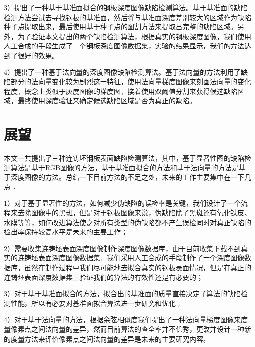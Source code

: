     3）提出了一种基于基准面拟合的钢板深度图像缺陷检测算法。基于基准面的缺陷检测方法尝试去寻找钢板的基准面，然后将与基准面深度差别较大的区域作为缺陷种子点提取出来，最后使用基于种子点的图割方法来提取出完整的缺陷区域。另外，为了验证本文提出的两个缺陷检测算法，根据真实的钢板深度图像，我们使用人工合成的手段生成了一个钢板深度图像数据集，实验的结果显示，我们的方法达到了很好的效果。

    4）提出了一种基于法向量的深度图像缺陷检测算法。基于法向量的方法利用了缺陷部分的法向量变化较为剧烈这一特征，使用法向量梯度图像来刻画法向量的变化程度，概念上类似于灰度图像的梯度图，接着使用双阈值分割来获得候选缺陷区域，最终使用深度验证来确定候选缺陷区域是否为真正的缺陷。
    \section{展望}
    本文一共提出了三种连铸坯钢板表面缺陷检测算法，其中，基于显著性图的缺陷检测算法是基于RGB图像的方法，基于基准面拟合的方法和基于法向量的方法是基于深度图像的方法。总结一下目前方法的不足之处，未来的工作主要集中在一下几点：

    1）对于基于显著性的方法，如何减少伪缺陷的误检率是关键，我们设计了一个流程来去除图像中的黑斑，但是对于钢板图像来说，伪缺陷除了黑斑还有氧化铁皮、水膜等等，如何改进算法使之对所有类型的伪缺陷都不产生误检同时对真正缺陷的检出率保持较高水平是未来的主要工作；

    2）需要收集连铸坯表面深度图像制作深度图像数据库，由于目前收集下载不到真实的连铸坯表面深度图像数据集，我们采用人工合成的手段制作了一个深度图像数据库，虽然在制作过程中我们尽可能地去拟合真实的钢板表面情况，但是在真正的连铸坯表面深度数据集上验证我们的算法的有效性还是有必要的；

    3）对于基于基准面拟合的方法，拟合出的基准面的质量直接决定了算法的缺陷检测性能，所以有必要对基准面拟合算法进一步研究和优化；

    4）对于基于法向量的方法，根据余弦相似度我们提出了一种法向量梯度图像来度量像素点之间法向量的差异，然而目前算法的查全率并不优秀，更改并设计一种新的度量方法来评价像素点之间法向量的差异是未来的主要研究内容。
